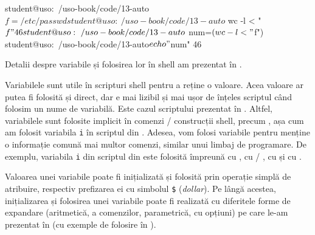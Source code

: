 \begin{screen}[caption={Folosirea variabilelor în shell},label={lst:auto:use-vars}]
student@uso:~/uso-book/code/13-auto$ f=/etc/passwd
student@uso:~/uso-book/code/13-auto$ wc -l < "$f"
46
student@uso:~/uso-book/code/13-auto$ num=$(wc -l < "$f")
student@uso:~/uso-book/code/13-auto$ echo "$num"
46
\end{screen}

Detalii despre variabile și folosirea lor în shell am prezentat în .

Variabilele sunt utile în scripturi shell pentru a reține o valoare.
Acea valoare ar putea fi folosită și direct, dar e mai lizibil și mai ușor de înțeles scriptul când folosim un nume de variabilă.
Este cazul scriptului  prezentat în .
Altfel, variabilele sunt folosite implicit în comenzi / construcții shell, precum , așa cum am folosit variabila \texttt{i} în scriptul  din .
Adesea, vom folosi variabile pentru menține o informație comună mai multor comenzi, similar unui limbaj de programare.
De exemplu, variabila \texttt{i} din scriptul  din  este folosită împreună cu , cu  / , cu  și cu .

Valoarea unei variabile poate fi inițializată și folosită prin operație simplă de atribuire, respectiv prefizarea ei cu simbolul \texttt{\$} (\textit{dollar}).
Pe lângă acestea, inițializarea și folosirea unei variabile poate fi realizată cu diferitele forme de expandare (aritmetică, a comenzilor, parametrică, cu opțiuni) pe care le-am prezentat în  (cu exemple de folosire în ).

